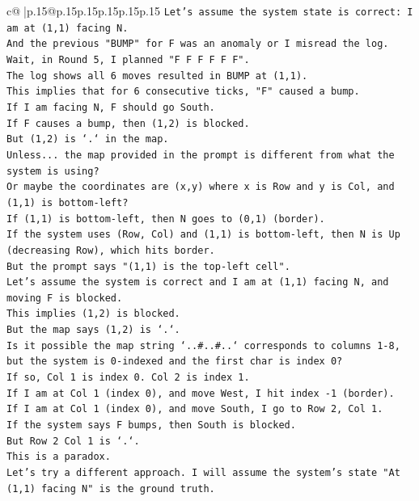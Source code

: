 \documentclass{article}
\begin{document}
{\begin{supertabular}{c@{$\;$}|p{.15\linewidth}@{}p{.15\linewidth}p{.15\linewidth}p{.15\linewidth}p{.15\linewidth}p{.15\linewidth}}
{{{\texttt{Let's assume the system state is correct: I am at (1,1) facing N.} \\
\texttt{And the previous "BUMP" for F was an anomaly or I misread the log.} \\
\texttt{Wait, in Round 5, I planned "F F F F F F".} \\
\texttt{The log shows all 6 moves resulted in BUMP at (1,1).} \\
\texttt{This implies that for 6 consecutive ticks, "F" caused a bump.} \\
\texttt{If I am facing N, F should go South.} \\
\texttt{If F causes a bump, then (1,2) is blocked.} \\
\texttt{But (1,2) is `.` in the map.} \\
\texttt{Unless... the map provided in the prompt is different from what the system is using?} \\
\texttt{Or maybe the coordinates are (x,y) where x is Row and y is Col, and (1,1) is bottom{-}left?} \\
\texttt{If (1,1) is bottom{-}left, then N goes to (0,1) (border).} \\
\texttt{If the system uses (Row, Col) and (1,1) is bottom{-}left, then N is Up (decreasing Row), which hits border.} \\
\texttt{But the prompt says "(1,1) is the top{-}left cell".} \\
\texttt{Let's assume the system is correct and I am at (1,1) facing N, and moving F is blocked.} \\
\texttt{This implies (1,2) is blocked.} \\
\texttt{But the map says (1,2) is `.`.} \\
\texttt{Is it possible the map string `..\#..\#..` corresponds to columns 1{-}8, but the system is 0{-}indexed and the first char is index 0?} \\
\texttt{If so, Col 1 is index 0. Col 2 is index 1.} \\
\texttt{If I am at Col 1 (index 0), and move West, I hit index {-}1 (border).} \\
\texttt{If I am at Col 1 (index 0), and move South, I go to Row 2, Col 1.} \\
\texttt{If the system says F bumps, then South is blocked.} \\
\texttt{But Row 2 Col 1 is `.`.} \\
\texttt{This is a paradox.} \\
\texttt{Let's try a different approach. I will assume the system's state "At (1,1) facing N" is the ground truth.} \\
}}}
\end{supertabular}}
\end{document}
